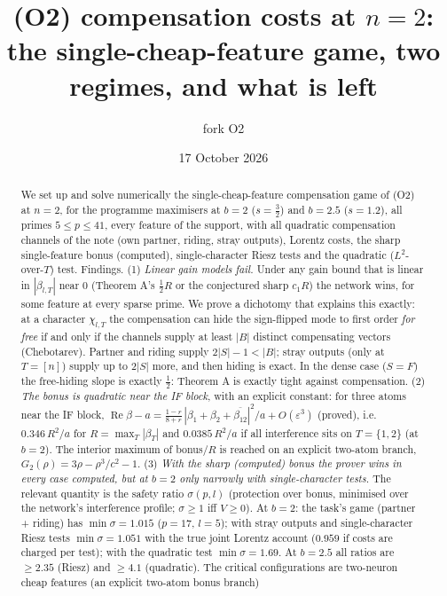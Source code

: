 \documentclass[11pt]{article}
\title{(O2) compensation costs at $n=2$:\\ the single-cheap-feature game, two regimes, and what is left}
\author{fork O2}
\date{17 October 2026}
\theoremstyle{definition}
\renewcommand{\Re}{\operatorname{Re}}
\begin{document}
\maketitle

\begin{abstract}
We set up and solve numerically the single-cheap-feature compensation game of (O2) at $n=2$, for the programme maximisers
at $b=2$ ($s=\frac32$) and $b=2.5$ ($s=1.2$), all primes $5\le p\le41$, every feature of the support, with all quadratic
compensation channels of the note (own partner, riding, stray outputs), Lorentz costs, the sharp single-feature bonus
(computed), single-character Riesz tests and the quadratic ($L^2$-over-$T$) test.  Findings.
(1) \emph{Linear gain models fail.}  Under any gain bound that is linear in $|\beta_{l,T}|$ near $0$ (Theorem A's $\frac12R$ or the
conjectured sharp $c_1R$) the network wins, for some feature at every sparse prime.  We prove a dichotomy that explains this exactly:
at a character $\chi_{l,T}$ the compensation can hide the sign-flipped mode to first order \emph{for free} if and only if the channels
supply at least $|B|$ distinct compensating vectors (Chebotarev).  Partner and riding supply $2|S|-1<|B|$; stray outputs (only at
$T=[n]$) supply up to $2|S|$ more, and then hiding is exact.  In the dense case ($S=F$) the free-hiding slope is exactly $\frac12$:
Theorem A is exactly tight against compensation.
(2) \emph{The bonus is quadratic near the IF block}, with an explicit constant: for three atoms near the IF block,
$\Re\beta-a=\frac{1-r}{8+r}\,|\beta_1+\beta_2+\overline{\beta_{12}}|^2/a+O(\varepsilon^3)$ (proved), i.e.\ $0.346\,R^2/a$ for $R=\max_T|\beta_T|$ and
$0.0385\,R^2/a$ if all interference sits on $T=\{1,2\}$ (at $b=2$).  The interior maximum of bonus$/R$ is reached on an explicit
two-atom branch, $G_2(\rho)=3\rho-\rho^3/c^2-1$.
(3) \emph{With the sharp (computed) bonus the prover wins in every case computed, but at $b=2$ only narrowly with single-character tests.}  The
relevant quantity is the safety ratio $\sigma(p,l)$ (protection over bonus, minimised over the network's interference profile; $\sigma\ge1$ iff $V\ge0$).
At $b=2$: the task's game (partner + riding) has $\min\sigma=1.015$ ($p=17$, $l=5$); with stray outputs and single-character Riesz tests
$\min\sigma=1.051$ with the true joint Lorentz account ($0.959$ if costs are charged per test); with the quadratic test $\min\sigma=1.69$.  At $b=2.5$ all
ratios are $\ge2.35$ (Riesz) and $\ge4.1$ (quadratic).  The critical configurations are two-neuron cheap features (an explicit two-atom bonus branch)

\end{abstract}
\end{document}
